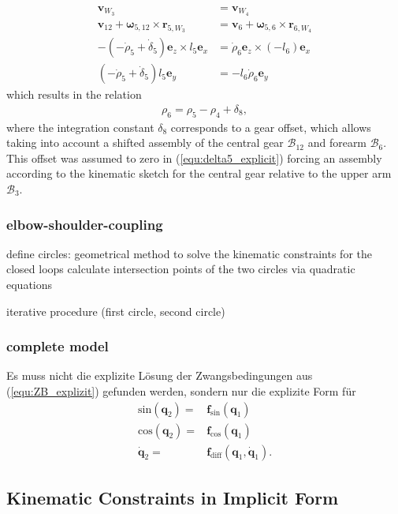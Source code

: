 \documentclass[letterpaper, 10 pt, conference]{ieeeconf}  %
\newcommand{\body}[1]{\mathcal{B}_{#1}}
\begin{document}
%
\begin{align}
\bm{v}_{W_3} &= \bm{v}_{W_4} \\
\bm{v}_{12} +\bm{\omega}_{5,12} \times \bm{r}_{5,W_3} &= \bm{v}_{6} +\bm{\omega}_{5,6} \times \bm{r}_{6,W_4} \\
-(-\dot{\rho}_5+\dot{\delta}_5)\bm{e}_z \times l_5\bm{e}_x &= \dot{\rho}_6\bm{e}_z \times (-l_6)\bm{e}_x \\
(-\dot{\rho}_5+\dot{\delta}_5) l_5 \bm{e}_y &= -l_6 \dot{\rho}_6\bm{e}_y
\end{align}
%
which results in the relation
%
\begin{align}
\rho_6 = \rho_5 - \rho_4 + \delta_8,
\end{align}
%
where the integration constant $\delta_8$ corresponds to a gear offset, which allows taking into account a shifted assembly of the central gear $\body{12}$ and forearm $\body{6}$. This offset was assumed to zero in (\ref{equ:delta5_explicit}) forcing an assembly according to the kinematic sketch for the central gear relative to the upper arm $\body{3}$.


\subsubsection{elbow-shoulder-coupling}

define circles: geometrical method to solve the kinematic constraints for the closed loops
calculate intersection points of the two circles via quadratic equations 

iterative procedure (first circle, second circle)

\subsubsection{complete model}



Es muss nicht die explizite Lösung der Zwangsbedingungen aus (\ref{equ:ZB_explizit}) gefunden werden, sondern nur die explizite Form für 
%
\begin{align}
\mathrm{sin}(\bm{q}_2) =& \bm{f}_\mathrm{sin}(\bm{q}_1) \\
\mathrm{cos}(\bm{q}_2) =& \bm{f}_\mathrm{cos}(\bm{q}_1) \\
\dot{\bm{q}}_2 =& \bm{f}_\mathrm{diff}(\bm{q}_1,\dot{\bm{q}}_1).
\end{align}


\subsection{Kinematic Constraints in Implicit Form}
\end{document}
